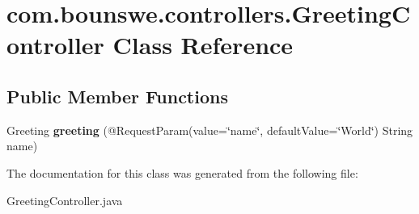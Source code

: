 \hypertarget{classcom_1_1bounswe_1_1controllers_1_1GreetingController}{}\section{com.\+bounswe.\+controllers.\+Greeting\+Controller Class Reference}
\label{classcom_1_1bounswe_1_1controllers_1_1GreetingController}
\subsection*{Public Member Functions}
\begin{DoxyCompactItemize}
\item 
\hypertarget{classcom_1_1bounswe_1_1controllers_1_1GreetingController_ae24a1e261096fe0f4f9bab2ca0f45206}{}Greeting {\bfseries greeting} (@Request\+Param(value=\char`\"{}name\char`\"{}, default\+Value=\char`\"{}World\char`\"{}) String name)\label{classcom_1_1bounswe_1_1controllers_1_1GreetingController_ae24a1e261096fe0f4f9bab2ca0f45206}

\end{DoxyCompactItemize}


The documentation for this class was generated from the following file\+:\begin{DoxyCompactItemize}
\item 
Greeting\+Controller.\+java\end{DoxyCompactItemize}
